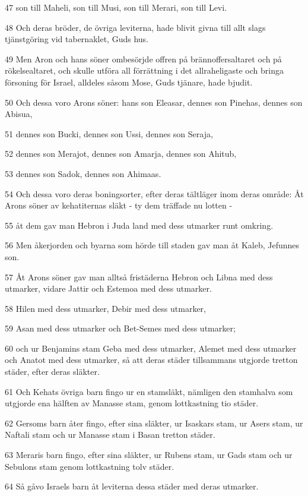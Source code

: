 \par 47 son till Maheli, son till Musi, son till Merari, son till Levi.
\par 48 Och deras bröder, de övriga leviterna, hade blivit givna till allt slags tjänstgöring vid tabernaklet, Guds hus.
\par 49 Men Aron och hans söner ombesörjde offren på brännoffersaltaret och på rökelsealtaret, och skulle utföra all förrättning i det allraheligaste och bringa försoning för Israel, alldeles såsom Mose, Guds tjänare, hade bjudit.
\par 50 Och dessa voro Arons söner: hans son Eleasar, dennes son Pinehas, dennes son Abisua,
\par 51 dennes son Bucki, dennes son Ussi, dennes son Seraja,
\par 52 dennes son Merajot, dennes son Amarja, dennes son Ahitub,
\par 53 dennes son Sadok, dennes son Ahimaas.
\par 54 Och dessa voro deras boningsorter, efter deras tältläger inom deras område: Åt Arons söner av kehatiternas släkt - ty dem träffade nu lotten -
\par 55 åt dem gav man Hebron i Juda land med dess utmarker runt omkring.
\par 56 Men åkerjorden och byarna som hörde till staden gav man åt Kaleb, Jefunnes son.
\par 57 Åt Arons söner gav man alltså fristäderna Hebron och Libna med dess utmarker, vidare Jattir och Estemoa med dess utmarker.
\par 58 Hilen med dess utmarker, Debir med dess utmarker,
\par 59 Asan med dess utmarker och Bet-Semes med dess utmarker;
\par 60 och ur Benjamins stam Geba med dess utmarker, Alemet med dess utmarker och Anatot med dess utmarker, så att deras städer tillsammans utgjorde tretton städer, efter deras släkter.
\par 61 Och Kehats övriga barn fingo ur en stamsläkt, nämligen den stamhalva som utgjorde ena hälften av Manasse stam, genom lottkastning tio städer.
\par 62 Gersoms barn åter fingo, efter sina släkter, ur Isaskars stam, ur Asers stam, ur Naftali stam och ur Manasse stam i Basan tretton städer.
\par 63 Meraris barn fingo, efter sina släkter, ur Rubens stam, ur Gads stam och ur Sebulons stam genom lottkastning tolv städer.
\par 64 Så gåvo Israels barn åt leviterna dessa städer med deras utmarker.
